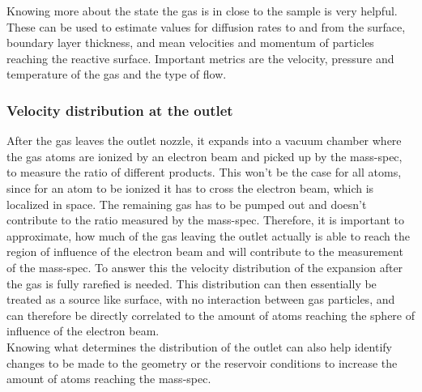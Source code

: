 	Knowing more about the state the gas is in close to the sample is very helpful.
	These can be used to estimate values for diffusion rates to and from the surface, boundary layer thickness, and mean velocities and momentum of particles reaching the reactive surface. 
	Important metrics are the velocity, pressure and temperature of the gas and the type of flow.

\subsubsection*{Velocity distribution at the outlet}

	After the gas leaves the outlet nozzle, it expands into a vacuum chamber where the gas atoms are ionized by an electron beam and picked up by the mass-spec, to measure the ratio of different products.
	This won't be the case for all atoms, since for an atom to be ionized it has to cross the electron beam, which is localized in space.
	The remaining gas has to be pumped out and doesn't contribute to the ratio measured by the mass-spec.
	Therefore, it is important to approximate, how much of the gas leaving the outlet actually is able to reach the region of influence of the electron beam and will contribute to the measurement of the mass-spec.
	To answer this the velocity distribution of the expansion after the gas is fully rarefied is needed.
	This distribution can then essentially be treated as a source like surface, with no interaction between gas particles, and can therefore be directly correlated to the amount of atoms reaching the sphere of influence of the electron beam.\\
	Knowing what determines the distribution of the outlet can also help identify changes to be made to the geometry or the reservoir conditions to increase the amount of atoms reaching the mass-spec.
